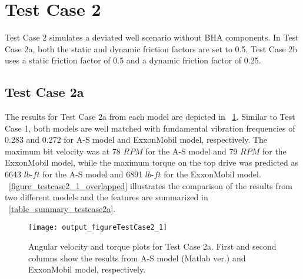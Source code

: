 \section{Test Case 2}
Test Case 2 simulates a deviated well scenario without BHA components. In Test Case 2a, both the static and dynamic friction factors are set to 0.5. Test Case 2b uses a static friction factor of 0.5 and a dynamic friction factor of 0.25.

\subsection{Test Case 2a}
The results for Test Case 2a from each model are depicted in \figurename~\ref{figure_testcase2_1}. Similar to Test Case 1, both models are well matched with fundamental vibration frequencies of 0.283 and 0.272 for A-S model and ExxonMobil model, respectively. The maximum bit velocity was at 78 $RPM$ for the A-S model and 79 $RPM$ for the ExxonMobil model, while the maximum torque on the top drive was predicted as 6643 $lb\mbox{-}ft$ for the A-S model and 6891 $lb\mbox{-}ft$ for the ExxonMobil model. \figurename~\ref{figure_testcase2_1_overlapped} illustrates the comparison of the results from two different models and the features are summarized in \tablename~\ref{table_summary_testcase2a}.
\begin{figure}
  \centering
  \texttt{[image: output\_figureTestCase2\_1]}
  \caption[Angular velocity and torque plots for Test Case 2a]{Angular velocity and torque plots for Test Case 2a. First and second columns show the results from A-S model (Matlab ver.) and ExxonMobil model, respectively.}\label{figure_testcase2_1}
\end{figure}

